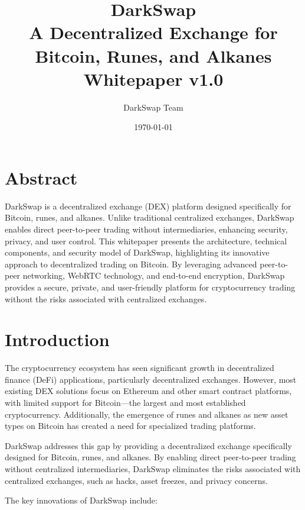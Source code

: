 \documentclass[11pt,a4paper]{article}
\title{
    \vspace{2cm}
    \Huge{\textbf{DarkSwap}}\\
    \vspace{0.5cm}
    \Large{A Decentralized Exchange for Bitcoin, Runes, and Alkanes}\\
    \vspace{0.5cm}
    \large{Whitepaper v1.0}\\
    \vspace{2cm}
}
\author{DarkSwap Team}
\date{\today}
\begin{document}
\maketitle
\thispagestyle{empty}
\newpage

\tableofcontents
\newpage

\section*{Abstract}

DarkSwap is a decentralized exchange (DEX) platform designed specifically for Bitcoin, runes, and alkanes. Unlike traditional centralized exchanges, DarkSwap enables direct peer-to-peer trading without intermediaries, enhancing security, privacy, and user control. This whitepaper presents the architecture, technical components, and security model of DarkSwap, highlighting its innovative approach to decentralized trading on Bitcoin. By leveraging advanced peer-to-peer networking, WebRTC technology, and end-to-end encryption, DarkSwap provides a secure, private, and user-friendly platform for cryptocurrency trading without the risks associated with centralized exchanges.

\newpage

\section{Introduction}

The cryptocurrency ecosystem has seen significant growth in decentralized finance (DeFi) applications, particularly decentralized exchanges. However, most existing DEX solutions focus on Ethereum and other smart contract platforms, with limited support for Bitcoin—the largest and most established cryptocurrency. Additionally, the emergence of runes and alkanes as new asset types on Bitcoin has created a need for specialized trading platforms.

DarkSwap addresses this gap by providing a decentralized exchange specifically designed for Bitcoin, runes, and alkanes. By enabling direct peer-to-peer trading without centralized intermediaries, DarkSwap eliminates the risks associated with centralized exchanges, such as hacks, asset freezes, and privacy concerns.

The key innovations of DarkSwap include:
\end{document}
